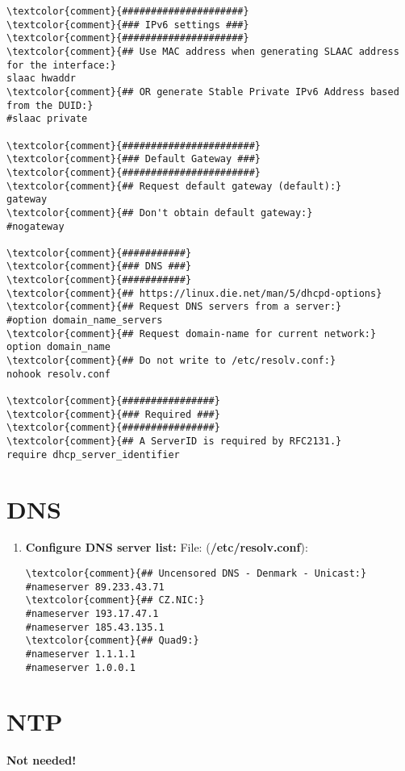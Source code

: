 \documentclass[10pt, a4paper, onecolumn, openany]{book} %
\begin{document}
\begin{enumerate}
\begin{Verbatim}[commandchars=\\\{\}]
\textcolor{comment}{#####################}
\textcolor{comment}{### IPv6 settings ###}
\textcolor{comment}{#####################}
\textcolor{comment}{## Use MAC address when generating SLAAC address for the interface:}
slaac hwaddr
\textcolor{comment}{## OR generate Stable Private IPv6 Address based from the DUID:}
#slaac private

\textcolor{comment}{#######################}
\textcolor{comment}{### Default Gateway ###}
\textcolor{comment}{#######################}
\textcolor{comment}{## Request default gateway (default):}
gateway
\textcolor{comment}{## Don't obtain default gateway:}
#nogateway

\textcolor{comment}{###########}
\textcolor{comment}{### DNS ###}
\textcolor{comment}{###########}
\textcolor{comment}{## https://linux.die.net/man/5/dhcpd-options}
\textcolor{comment}{## Request DNS servers from a server:}
#option domain_name_servers
\textcolor{comment}{## Request domain-name for current network:}
option domain_name
\textcolor{comment}{## Do not write to /etc/resolv.conf:}
nohook resolv.conf

\textcolor{comment}{################}
\textcolor{comment}{### Required ###}
\textcolor{comment}{################}
\textcolor{comment}{## A ServerID is required by RFC2131.}
require dhcp_server_identifier
\end{Verbatim} 
\end{enumerate}
\section{DNS}
\begin{enumerate}
    \item \textbf{Configure DNS server list:}
\newline File: (\textbf{\textcolor{file}{/etc/resolv.conf}}):
\begin{Verbatim}[commandchars=\\\{\}]
\textcolor{comment}{## Uncensored DNS - Denmark - Unicast:}
#nameserver 89.233.43.71
\textcolor{comment}{## CZ.NIC:}
#nameserver 193.17.47.1
#nameserver 185.43.135.1
\textcolor{comment}{## Quad9:}
#nameserver 1.1.1.1
#nameserver 1.0.0.1
\end{Verbatim}
\end{enumerate}


\section{NTP}
\textbf{Not needed!}
\end{document}
